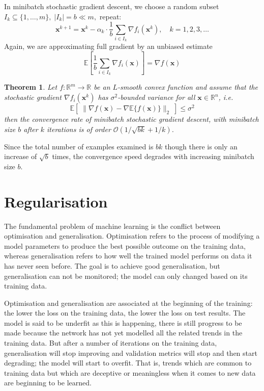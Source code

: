 \documentclass[12pt]{report}
\newtheorem{thm}{Theorem}[section]
\numberwithin{equation}{section}
\begin{document}
In minibatch stochastic gradient descent,  we choose a random subset $I_{k} \subseteq\{1, \ldots, m\},\;\left|I_{k}\right|=b \ll m,$ repeat:
\begin{equation}\label{eqn:mini_sgd}
\bm{x}^{k+1}=\bm{x}^{k}- \alpha_k \cdot \frac{1}{b} \sum_{i \in I_{k}} \nabla f_{i}\left(\bm{x}^{k}\right), \quad k=1,2,3, \ldots
\end{equation}
Again, we are approximating full gradient by an unbiased estimate
\[
\mathbb{E}\left[\frac{1}{b} \sum_{i \in I_{k}} \nabla f_{i}(\bm{x})\right]=\nabla f(\bm{x})
\]
\begin{thm}
Let $f:\mathbb{R}^m\rightarrow\mathbb{R}$ be an $L$-smooth convex function and assume that the stochastic gradient $\nabla f_i(\bm{x}^k)$ has $\sigma^2$-bounded variance for all $\bm{x} \in \mathbb{R}^n$, i.e.
\[
\mathbb{E}\left[\;\|\nabla f(\bm{x}) - \nabla\mathbb{E}\{f(\bm{x})\} \|_2\;\right] \leq \sigma^2
\]
then the convergence rate of minibatch stochastic gradient descent, with minibatch size $b$ after $k$ iterations is of order $\mathcal{O}(1/\sqrt{bk}+1/k)$.
\end{thm}
\noindent
Since the total number of examples examined is $bk$ though there is only an increase of $\sqrt{b}$ times, the convergence speed degrades with increasing minibatch size $b$.

\section{Regularisation}\label{sec:regularisation}
The fundamental problem of machine learning is the conflict between optimisation and generalisation. Optimisation refers to the process of modifying a model parameters to produce the best possible outcome on the training data, whereas generalisation refers to how well the trained model performs on data it has never seen before. The goal is to achieve good generalisation, but generalisation can not be monitored; the model can only changed based on its training data. 

Optimisation and generalisation are associated at the beginning of the training: the lower the loss on the training data, the lower the loss on test results. The model is said to be {underfit} as this is happening, there is still progress to be made because the network has not yet modelled all the related trends in the training data. But after a number of iterations on the training data, generalisation will stop improving and validation metrics will stop and then start degrading; the model will start to {overfit}. That is, trends which are common to training data but which are deceptive or meaningless when it comes to new data are beginning to be learned.
\end{document}
